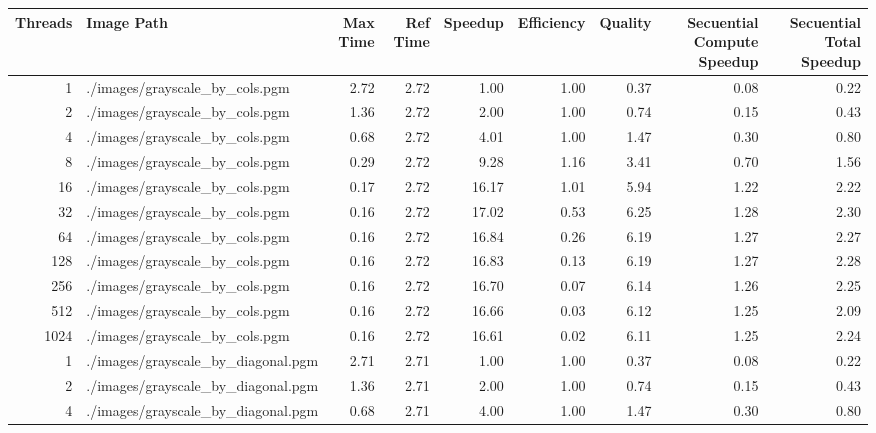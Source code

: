         \begin{table}[H]
            \centering
            \begin{adjustbox}{width=\textwidth, keepaspectratio}
                \begin{tabular}{rlrrrrrrr}
                    \toprule
                    Threads & Image Path & Max Time & Ref Time & Speedup & Efficiency & Quality & Secuential Compute Speedup & Secuential Total Speedup \\
                    \midrule
                    1 & ./images/grayscale\_by\_cols.pgm & 2.72 & 2.72 & 1.00 & 1.00 & 0.37 & 0.08 & 0.22 \\
                    2 & ./images/grayscale\_by\_cols.pgm & 1.36 & 2.72 & 2.00 & 1.00 & 0.74 & 0.15 & 0.43 \\
                    4 & ./images/grayscale\_by\_cols.pgm & 0.68 & 2.72 & 4.01 & 1.00 & 1.47 & 0.30 & 0.80 \\
                    8 & ./images/grayscale\_by\_cols.pgm & 0.29 & 2.72 & 9.28 & 1.16 & 3.41 & 0.70 & 1.56 \\
                    16 & ./images/grayscale\_by\_cols.pgm & 0.17 & 2.72 & 16.17 & 1.01 & 5.94 & 1.22 & 2.22 \\
                    32 & ./images/grayscale\_by\_cols.pgm & 0.16 & 2.72 & 17.02 & 0.53 & 6.25 & 1.28 & 2.30 \\
                    64 & ./images/grayscale\_by\_cols.pgm & 0.16 & 2.72 & 16.84 & 0.26 & 6.19 & 1.27 & 2.27 \\
                    128 & ./images/grayscale\_by\_cols.pgm & 0.16 & 2.72 & 16.83 & 0.13 & 6.19 & 1.27 & 2.28 \\
                    256 & ./images/grayscale\_by\_cols.pgm & 0.16 & 2.72 & 16.70 & 0.07 & 6.14 & 1.26 & 2.25 \\
                    512 & ./images/grayscale\_by\_cols.pgm & 0.16 & 2.72 & 16.66 & 0.03 & 6.12 & 1.25 & 2.09 \\
                    1024 & ./images/grayscale\_by\_cols.pgm & 0.16 & 2.72 & 16.61 & 0.02 & 6.11 & 1.25 & 2.24 \\
                    1 & ./images/grayscale\_by\_diagonal.pgm & 2.71 & 2.71 & 1.00 & 1.00 & 0.37 & 0.08 & 0.22 \\
                    2 & ./images/grayscale\_by\_diagonal.pgm & 1.36 & 2.71 & 2.00 & 1.00 & 0.74 & 0.15 & 0.43 \\
                    4 & ./images/grayscale\_by\_diagonal.pgm & 0.68 & 2.71 & 4.00 & 1.00 & 1.47 & 0.30 & 0.80 \\

\end{tabular}
\end{adjustbox}
\end{table}
